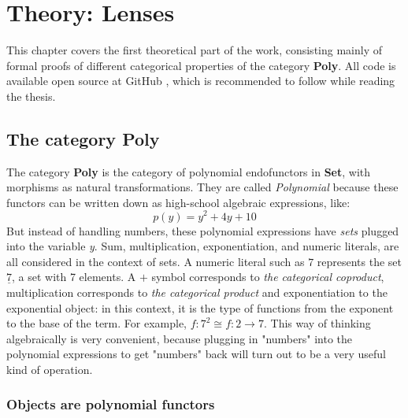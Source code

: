 
\chapter{Theory: Lenses}\label{chapter:lenses}
This chapter covers the first theoretical part of the work, consisting mainly of formal proofs of different categorical properties of the category \textbf{Poly}. All code is available open source at GitHub \cite{githubRepo}, which is recommended to follow while reading the thesis.

\section{The category \textbf{Poly}}

The category \textbf{Poly} is the category of polynomial endofunctors in \textbf{Set}, with morphisms as natural transformations. They are called \textit{Polynomial} because these functors can be written down as high-school algebraic expressions, like:
$$p(y) = y^2 +4y + 10$$
But instead of handling numbers, these polynomial expressions have \textit{sets} plugged into the variable \textit{y}.
Sum, multiplication, exponentiation, and numeric literals, are all considered in the context of sets. A numeric literal such as $7$ represents the set $\underline{7}$, a set with 7 elements. A $+$ symbol corresponds to \textit{the categorical coproduct}, multiplication  corresponds to \textit{the categorical product} and exponentiation to the exponential object: in this context, it is the type of functions from the exponent to the base of the term. For example, $ f : 7^2 \cong f : 2 \rightarrow 7$. This way of thinking algebraically is very convenient, because plugging in "numbers" into the polynomial expressions to get "numbers" back will turn out to be a very useful kind of operation.

\subsection{Objects are polynomial functors}

